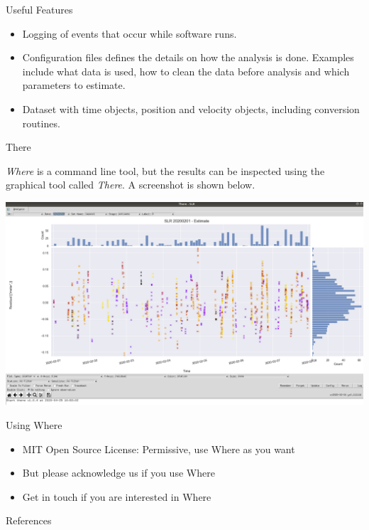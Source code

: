 \documentclass[12pt]{beamer}
\begin{document}
\begin{frame}{Useful Features}
\begin{itemize}
\item
  Logging of events that occur while software runs. 
\item 
  Configuration files defines the details on how the analysis is done. Examples include what data is used, how to clean the data before analysis and which parameters to estimate.
\item 
  Dataset with time objects, position and velocity objects, including conversion routines. 
\end{itemize}
\end{frame}
 

\begin{frame}{There}

\textit{Where} is a command line tool, but the results can be inspected using the graphical tool called \textit{There}. A screenshot is shown below.

\begin{center}
  \includegraphics[height=0.6\textheight]{./figure/there.png}
\end{center}
\end{frame}


\begin{frame}{Using Where}
\begin{itemize}
\item 
  MIT Open Source License: Permissive, use Where as you want
\item
  But please acknowledge us if you use Where
\item 
  Get in touch if you are interested in Where
\end{itemize}
\end{frame}


\begin{frame}{References}
\tiny



\end{frame}
\end{document}
